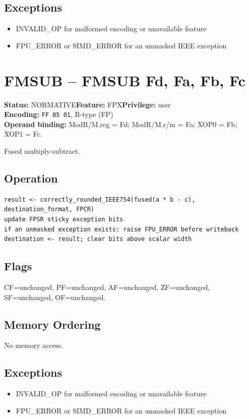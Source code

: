 \documentclass[10pt]{article}
\begin{document}
\subsection*{Exceptions}
\begin{itemize}
\item INVALID\_OP for malformed encoding or unavailable feature
\item FPU\_ERROR or SIMD\_ERROR for an unmasked IEEE exception
\end{itemize}
\clearpage

\section{FMSUB -- FMSUB Fd, Fa, Fb, Fc}
\textbf{Status:} NORMATIVE\quad \textbf{Feature:} FPX\quad \textbf{Privilege:} user\\
\textbf{Encoding:} \texttt{FF 05 01}, R-type (FP)\\
\textbf{Operand binding:} ModR/M.reg = Fd; ModR/M.r/m = Fa; XOP0 = Fb; XOP1 = Fc.

Fused multiply-subtract.

\subsection*{Operation}
\begin{lstlisting}
result <- correctly_rounded_IEEE754(fused(a * b - c), destination_format, FPCR)
update FPSR sticky exception bits
if an unmasked exception exists: raise FPU_ERROR before writeback
destination <- result; clear bits above scalar width
\end{lstlisting}
\subsection*{Flags}
CF=unchanged, PF=unchanged, AF=unchanged, ZF=unchanged, SF=unchanged, OF=unchanged.
\subsection*{Memory Ordering}
No memory access.
\subsection*{Exceptions}
\begin{itemize}
\item INVALID\_OP for malformed encoding or unavailable feature
\item FPU\_ERROR or SIMD\_ERROR for an unmasked IEEE exception
\end{itemize}
\clearpage
\end{document}
